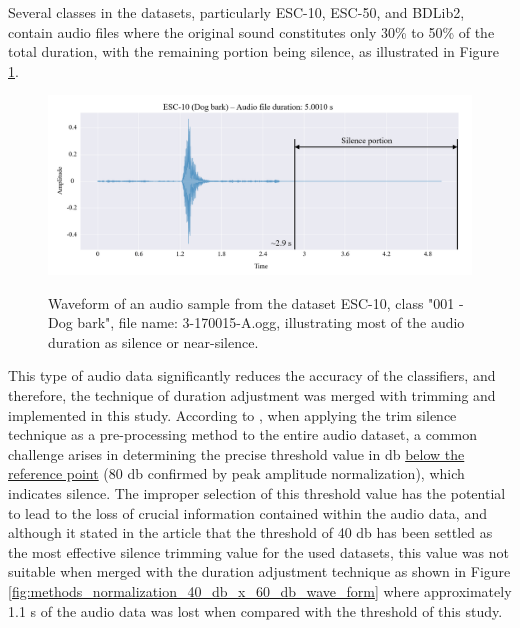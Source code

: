 Several classes in the datasets, particularly ESC-10, ESC-50, and BDLib2, contain audio files where the original sound constitutes only 30\% to 50\% of the total duration, with the remaining portion being silence, as illustrated in Figure \ref{fig:methods_normalization_original_wave_form}.

\begin{figure}[htbp]
    \raggedright
        \caption{Waveform of an audio sample from the dataset ESC-10, class "001 - Dog bark", file name: 3-170015-A.ogg, illustrating most of the audio duration as silence or near-silence.}
        \includegraphics[width=1\textwidth]{resources/images/050-methods/Methods_normalization_original.png}
        \label{fig:methods_normalization_original_wave_form}
\end{figure}

This type of audio data significantly reduces the accuracy of the classifiers, and therefore, the technique of duration adjustment was merged with trimming and implemented in this study. According to \textcite{Mushtaq2020b}, when applying the trim silence technique as a pre-processing method to the entire audio dataset, a common challenge arises in determining the precise threshold value in \gls{db} \underline{below the reference point} (80 \gls{db} confirmed by peak amplitude normalization), which indicates silence. The improper selection of this threshold value has the potential to lead to the loss of crucial information contained within the audio data, and although it stated in the article that the threshold of 40 \gls{db} has been settled as the most effective silence trimming value for the used datasets, this value was not suitable when merged with the duration adjustment technique as shown in Figure \ref{fig:methods_normalization_40_db_x_60_db_wave_form} where approximately 1.1 \gls{s} of the audio data was lost when compared with the threshold of this study.

